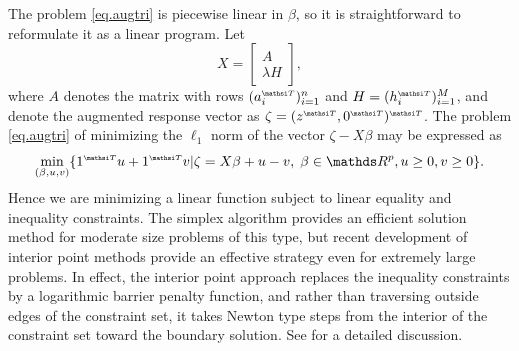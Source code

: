 The problem \eqref{eq.augtri} is piecewise linear in $\beta$, so it
is straightforward to reformulate it as a linear program.  Let
\[
X = \left[ \begin{array}{c} A \\ \lambda H \end{array} \right] ,
\]
where $A$ denotes the matrix with rows $(a_i \trans )_{i=1}^n$ and
$ H = (h_i \trans)_{i=1}^M$, and denote the augmented response vector as 
$\zeta = (z \trans , 0 \trans ) \trans$.  The problem \eqref{eq.augtri} 
of minimizing the $\ell_1$ norm of the vector $\zeta - X\beta$ 
may be expressed as
\begin{equation}
\label{eq.lpform}
\min_{(\beta,u,v)} \{ 
1 \trans u +
1 \trans v | \zeta = X\beta +u -v, \; \beta \in \RR^p, u \geq 0, v \geq 0 \}.
\end{equation}
Hence we are minimizing a linear function subject to linear equality and
inequality constraints.  The simplex algorithm provides
an efficient solution method for moderate size problems of this type, 
but recent development of interior point methods provide an effective 
strategy even for  extremely large problems.  In effect, the interior point 
approach replaces the inequality constraints by a logarithmic barrier 
penalty function, and rather than traversing outside edges of the 
constraint set, it takes Newton type steps from the interior of the
constraint set toward the boundary solution.  See 
for a detailed discussion.


